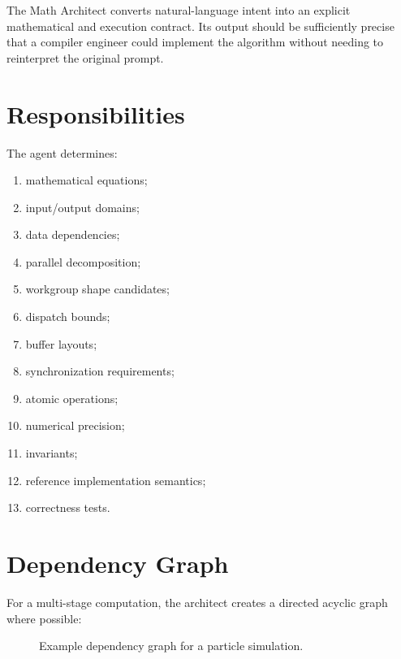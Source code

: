 \documentclass[11pt,a4paper,oneside]{report}
\begin{document}
The Math Architect converts natural-language intent into an explicit mathematical and execution
contract. Its output should be sufficiently precise that a compiler engineer could implement the
algorithm without needing to reinterpret the original prompt.

\section{Responsibilities}

The agent determines:

\begin{enumerate}
  \item mathematical equations;
  \item input/output domains;
  \item data dependencies;
  \item parallel decomposition;
  \item workgroup shape candidates;
  \item dispatch bounds;
  \item buffer layouts;
  \item synchronization requirements;
  \item atomic operations;
  \item numerical precision;
  \item invariants;
  \item reference implementation semantics;
  \item correctness tests.
\end{enumerate}

\section{Dependency Graph}

For a multi-stage computation, the architect creates a directed acyclic graph where possible:

\begin{figure}[H]
\centering
{}
\caption{Example dependency graph for a particle simulation.}
\end{figure}
\end{document}
